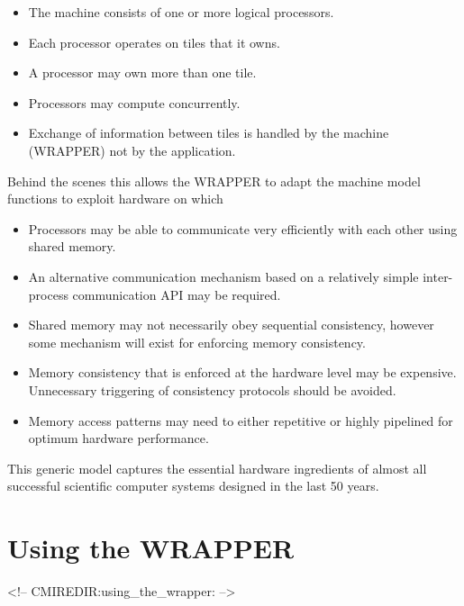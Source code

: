 \begin{itemize}
\item The machine consists of one or more logical processors.
\item Each processor operates on tiles that it owns.
\item A processor may own more than one tile.
\item Processors may compute concurrently.
\item Exchange of information between tiles is handled by the
  machine (WRAPPER) not by the application.
\end{itemize}
Behind the scenes this allows the WRAPPER to adapt the machine model
functions to exploit hardware on which
\begin{itemize}
\item Processors may be able to communicate very efficiently with each
  other using shared memory.
\item An alternative communication mechanism based on a relatively
  simple inter-process communication API may be required.
\item Shared memory may not necessarily obey sequential consistency,
  however some mechanism will exist for enforcing memory consistency.
\item Memory consistency that is enforced at the hardware level
  may be expensive. Unnecessary triggering of consistency protocols
  should be avoided.
\item Memory access patterns may need to either repetitive or highly
  pipelined for optimum hardware performance.
\end{itemize}

This generic model captures the essential hardware ingredients
of almost all successful scientific computer systems designed in the
last 50 years.

\section{Using the WRAPPER}
\begin{rawhtml}
<!-- CMIREDIR:using_the_wrapper: -->
\end{rawhtml}

